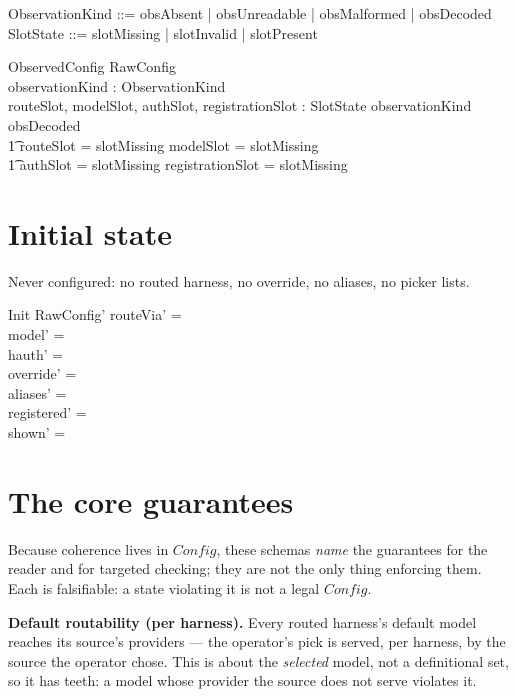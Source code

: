 \documentclass{article}
\begin{document}
\begin{zed}
	ObservationKind ::= obsAbsent | obsUnreadable | obsMalformed | obsDecoded \\
	SlotState ::= slotMissing | slotInvalid | slotPresent
\end{zed}

\begin{schema}{ObservedConfig}
	RawConfig \\
	observationKind : ObservationKind \\
	routeSlot, modelSlot, authSlot, registrationSlot : SlotState
	\where
	observationKind \neq obsDecoded \implies \\
	\t1 routeSlot = slotMissing \land modelSlot = slotMissing \land \\
	\t1 authSlot = slotMissing \land registrationSlot = slotMissing
\end{schema}

\section{Initial state}

Never configured: no routed harness, no override, no aliases, no picker lists.

\begin{schema}{Init}
	RawConfig'
	\where
	routeVia' = \emptyset \\
	model' = \emptyset \\
	hauth' = \emptyset \\
	override' = \emptyset \\
	aliases' = \emptyset \\
	registered' = \emptyset \\
	shown' = \emptyset
\end{schema}

\section{The core guarantees}

Because coherence lives in $Config$, these schemas \emph{name} the guarantees
for the reader and for targeted checking; they are not the only thing enforcing
them. Each is falsifiable: a state violating it is not a legal $Config$.

\textbf{Default routability (per harness).} Every routed harness's default model
reaches its source's providers --- the operator's pick is served, per harness,
by the source the operator chose. This is about the \emph{selected} model, not a
definitional set, so it has teeth: a model whose provider the source does not
serve violates it.
\end{document}
